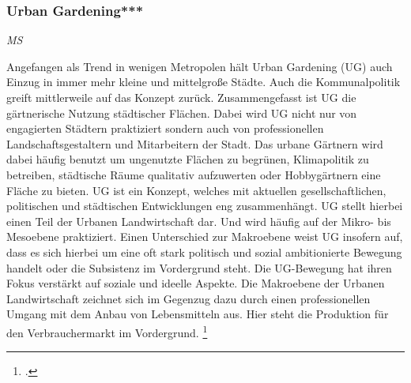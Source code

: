 \documentclass{scrartcl}
\begin{document}
\subsubsection{Urban Gardening***}\textit{MS}

Angefangen als Trend in wenigen Metropolen hält Urban Gardening (UG) auch Einzug in immer mehr kleine und mittelgroße Städte. Auch die Kommunalpolitik greift mittlerweile auf das Konzept zurück. Zusammengefasst ist UG die gärtnerische Nutzung städtischer Flächen. Dabei wird UG nicht nur von engagierten Städtern praktiziert sondern auch von professionellen Landschaftsgestaltern und Mitarbeitern der Stadt. Das urbane Gärtnern wird dabei häufig benutzt um ungenutzte Flächen zu begrünen, Klimapolitik zu betreiben, städtische Räume qualitativ aufzuwerten oder Hobbygärtnern eine Fläche zu bieten. UG ist ein Konzept, welches mit aktuellen gesellschaftlichen, politischen und städtischen Entwicklungen eng zusammenhängt.
UG stellt hierbei einen Teil der Urbanen Landwirtschaft dar. Und wird häufig auf der Mikro- bis Mesoebene praktiziert. Einen Unterschied zur Makroebene weist UG insofern auf, dass es sich hierbei um eine oft stark politisch und sozial ambitionierte Bewegung handelt oder die Subsistenz im Vordergrund steht. Die UG-Bewegung hat ihren Fokus verstärkt auf soziale und ideelle Aspekte. Die Makroebene der Urbanen Landwirtschaft zeichnet sich im Gegenzug dazu durch einen professionellen Umgang mit dem Anbau von Lebensmitteln aus. Hier steht die Produktion für den Verbrauchermarkt im Vordergrund. \footcite[S.27]{}
\end{document}
